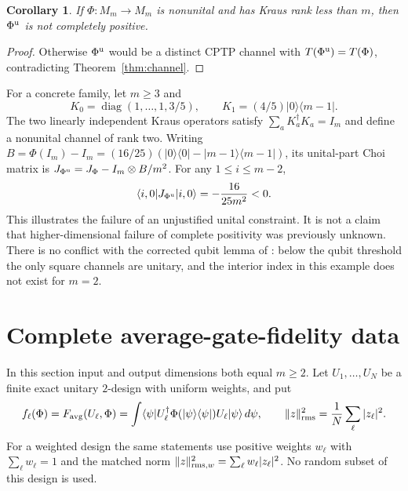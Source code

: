 \documentclass[11pt,a4paper]{article}
\newtheorem{corollary}[theorem]{Corollary}
\begin{document}
\begin{corollary}\label{cor:unital}
If $\Phi:M_m\to M_m$ is nonunital and has Kraus rank less than $m$,
then $\Phi^{\rm u}$ is not completely positive.
\end{corollary}
\begin{proof}
Otherwise $\Phi^{\rm u}$ would be a distinct CPTP channel with
$T(\Phi^{\rm u})=T(\Phi)$, contradicting Theorem~\ref{thm:channel}.
\end{proof}

For a concrete family, let $m\ge3$ and
\[
 K_0=\operatorname{diag}(1,\ldots,1,3/5),\qquad
 K_1=(4/5)|0\rangle\langle m-1|.
\]
The two linearly independent Kraus operators satisfy
$\sum_aK_a^\dagger K_a=I_m$ and define a nonunital channel of rank two.
Writing $B=\Phi(I_m)-I_m=(16/25)(|0\rangle\langle0|
-|m-1\rangle\langle m-1|)$, its unital-part Choi matrix is
$J_{\Phi^{\rm u}}=J_\Phi-I_m\otimes B/m^2$.
For any $1\le i\le m-2$,
\[
 \langle i,0|J_{\Phi^{\rm u}}|i,0\rangle=-\frac{16}{25m^2}<0.
\]
This illustrates the failure of an unjustified unital constraint.
It is not a claim that higher-dimensional failure of complete
positivity was previously unknown. There is no conflict with the
corrected qubit lemma of \cite{erratum}: below the qubit threshold
the only square channels are unitary, and the interior index in this
example does not exist for $m=2$.

\section{Complete average-gate-fidelity data}
In this section input and output dimensions both equal $m\ge2$.
Let $U_1,\ldots,U_N$ be a finite exact unitary $2$-design with uniform
weights, and put
\[
 f_\ell(\Phi)=F_{\rm avg}(U_\ell,\Phi)
 =\int\langle\psi|U_\ell^\dagger
       \Phi(|\psi\rangle\langle\psi|)U_\ell|\psi\rangle\,d\psi,
 \qquad
 \|z\|_{\rm rms}^2=\frac1N\sum_\ell|z_\ell|^2 .
\]
For a weighted design the same statements use positive weights
$w_\ell$ with $\sum_\ell w_\ell=1$ and the matched norm
$\|z\|_{{\rm rms},w}^2=\sum_\ell w_\ell|z_\ell|^2$.
No random subset of this design is used.
\end{document}
